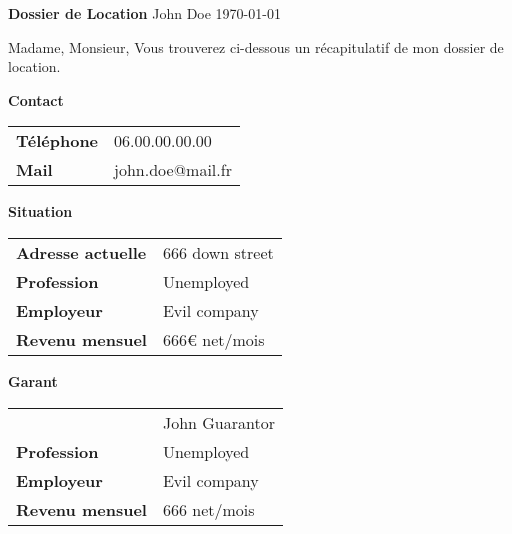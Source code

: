 \newpage
\thispagestyle{empty}


\vspace{0.5cm}
{\center\color{white} 
{\Huge \textbf{Dossier de Location}}
\newPar
{\Large John Doe}
\newPar
{\Large \today}\\
}
\vspace{40mm}


{\large
Madame, Monsieur,
\newPar
\lipsum[1]
\newPar
Vous trouverez ci-dessous un récapitulatif de mon dossier de location.
\newPar

\lineh

\textbf{Contact}\\
\newPar
\begin{tabularx}{\textwidth}{p{4cm}X}
\textbf{Téléphone} & 06.00.00.00.00\\
\textbf{Mail} & john.doe@mail.fr
\end{tabularx}
\newPar

\lineh

\textbf{Situation}\\
\newPar
\begin{tabularx}{\textwidth}{p{4cm}X}
\textbf{Adresse actuelle} & 666 down street\\
\textbf{Profession} & Unemployed\\
\textbf{Employeur} & Evil company\\
\textbf{Revenu mensuel} & 666€ net/mois
\end{tabularx}
\newPar

\lineh

\textbf{Garant}
\newPar
\begin{tabularx}{\textwidth}{p{4cm}X}
& John Guarantor\\
\textbf{Profession} & Unemployed\\
\textbf{Employeur} & Evil company\\
\textbf{Revenu mensuel} & 666 net/mois\\
\end{tabularx}
}